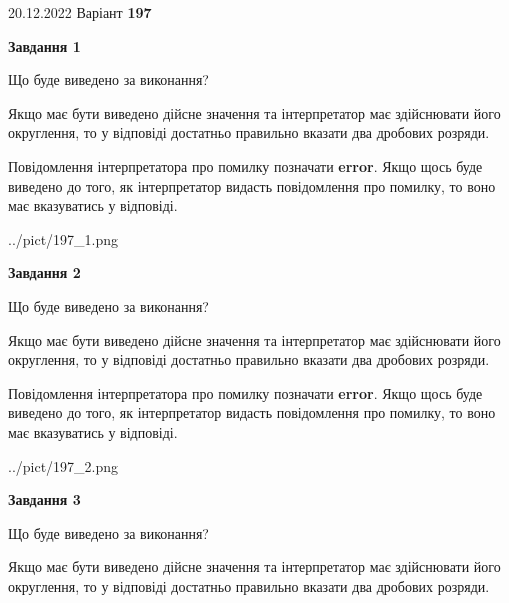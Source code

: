 \documentclass[12pt, ukrainian]{article}
\begin{document}
{20.12.2022 Варіант \No \textbf { 197 }\par}
{
\begin {Large}

{\begin {center}\textbf{Завдання 1}\end {center}}\par
Що буде виведено за виконання? \par

Якщо має бути виведено дійсне значення та інтерпретатор має здійснювати його округлення, 
то у відповіді достатньо правильно вказати два дробових розряди.

Повідомлення інтерпретатора про помилку позначати \textbf{error}.
Якщо щось буде виведено до того, як інтерпретатор видасть повідомлення про помилку, 
то воно має вказуватись у відповіді. \par

\begin{center}
	{../pict/197_1.png}
\end{center}
\newpage

{\begin {center}\textbf{Завдання 2}\end {center}}\par
Що буде виведено за виконання? \par

Якщо має бути виведено дійсне значення та інтерпретатор має здійснювати його округлення, 
то у відповіді достатньо правильно вказати два дробових розряди.

Повідомлення інтерпретатора про помилку позначати \textbf{error}.
Якщо щось буде виведено до того, як інтерпретатор видасть повідомлення про помилку, 
то воно має вказуватись у відповіді. \par

\begin{center}
	{../pict/197_2.png}
\end{center}
\newpage

{\begin {center}\textbf{Завдання 3}\end {center}}\par
Що буде виведено за виконання? \par

Якщо має бути виведено дійсне значення та інтерпретатор має здійснювати його округлення, 
то у відповіді достатньо правильно вказати два дробових розряди.


\end{Large}}
\end{document}
